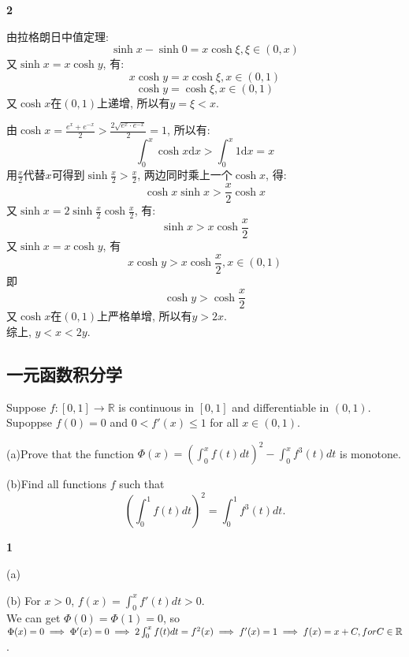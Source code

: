 \documentclass[12pt]{article}
\newenvironment{solution}[2][Solution]{\begin{trivlist}
\item[\hskip \labelsep {\bfseries #1}]}{\end{trivlist}}
\newenvironment{problem}[2][Problem]{\begin{trivlist}
\item[\hskip \labelsep {\bfseries #1}\hskip \labelsep {\bfseries #2.}]}{\end{trivlist}}
\begin{document}
\begin{solution}{2} \textbf{2}

    由拉格朗日中值定理:
    \[
        \sinh x - \sinh 0 = x\cosh \xi , \xi\in \left(0, x\right)    
    \]    
    又$\sinh x = x\cosh y $, 有:
    \[
        x\cosh y = x\cosh \xi , x\in\left(0, 1\right)
    \]
    \[
        \cosh y = \cosh \xi , x\in\left(0, 1\right)
    \]
    又$\cosh x$在$\left(0, 1\right)$上递增, 所以有$y = \xi < x$.

    由$\cosh x = \frac{e^x + e^{-x}}{2} > \frac{2\sqrt{e^x\cdot e^{-x}}}{2} = 1$, 所以有:
    \[
        \int_0^x \cosh x \mathrm{d}x > \int_0^x 1\mathrm{d}x = x
    \]
    用$\frac{x}{2}$代替$x$可得到$\sinh \frac{x}{2} > \frac{x}{2}$, 两边同时乘上一个$\cosh x$, 得:
    \[
        \cosh x \sinh x > \frac{x}{2}\cosh x    
    \]
    又$\sinh x = 2\sinh \frac{x}{2}\cosh\frac{x}{2}$, 有:
    \[
        \sinh x > x\cosh \frac{x}{2}     
    \]
    又$\sinh x = x\cosh y$, 有
    \[
         x\cosh y > x\cosh \frac{x}{2}, x\in\left(0, 1\right)  
    \]
    即
    \[
        \cosh y > \cosh \frac{x}{2}
    \]
    又$\cosh x$在$\left(0, 1\right)$上严格单增, 所以有$y>2x$.\\
    综上, $y<x<2y$.
\end{solution}


\pagebreak









\subsection{一元函数积分学}

\begin{problem}{1}

    Suppose $ f: [0, 1] \to \mathbb{R} $ is continuous in $[0,1]$ and differentiable in $(0,1)$. Supoppse $f(0) = 0$ and 
    $0<f'(x)\leq 1$ for all $x \in (0,1)$. 
    \item (a)Prove that the function $\Phi (x) = (\int_{0}^{x} f(t)dt)^2 - \int_{0}^{x} f^3(t)dt$ is monotone.
    \item (b)Find all functions $f$ such that
        \[
            (\int_{0}^{1} f(t) dt)^2 = \int_{0}^{1} f^3(t) dt.
        \]
    
\end{problem}


\begin{solution}{1} \textbf{1}

    \item (a) 
    \item (b) For $x>0$, $f(x) = \int_{0}^{x} f'(t)dt > 0$. \\
        We can get $\Phi(0) = \Phi(1) = 0$, so $\Phi(x) = 0 \implies \Phi'(x) = 0 \implies 2\int_{0}^{x}f(t)dt = f^2 (x) \\
        \implies f'(x) = 1 \implies f(x) = x + C, for C \in \mathbb{R} $.
    
\end{solution}
\end{document}
